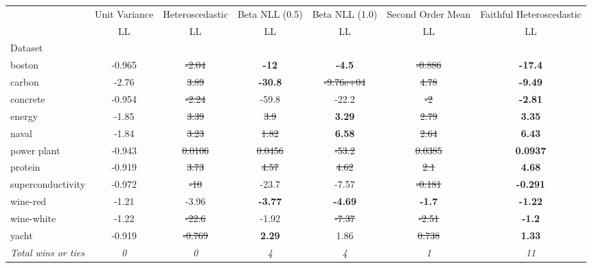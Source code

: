 \begin{tabular}{l|c|c|c|c|c|c}
\toprule
{} & {Unit Variance} & {Heteroscedastic} & {Beta NLL (0.5)} & {Beta NLL (1.0)} & {Second Order Mean} & {Faithful Heteroscedastic} \\
{} & {LL} & {LL} & {LL} & {LL} & {LL} & {LL} \\
{Dataset} & {} & {} & {} & {} & {} & {} \\
\midrule
boston & -0.965 & \sout{-2.04} & \textbf{-12} & \textbf{-4.5} & \sout{-0.886} & \textbf{-17.4} \\
carbon & -2.76 & \sout{3.89} & \textbf{-30.8} & \sout{-9.76e+04} & \sout{4.78} & \textbf{-9.49} \\
concrete & -0.954 & \sout{-2.24} & -59.8 & -22.2 & \sout{-2} & \textbf{-2.81} \\
energy & -1.85 & \sout{3.39} & \sout{3.9} & \textbf{3.29} & \sout{2.79} & \textbf{3.35} \\
naval & -1.84 & \sout{3.23} & \sout{1.82} & \textbf{6.58} & \sout{2.64} & \textbf{6.43} \\
power plant & -0.943 & \sout{0.0106} & \sout{0.0456} & \sout{-53.2} & \sout{0.0385} & \textbf{0.0937} \\
protein & -0.919 & \sout{3.73} & \sout{4.57} & \sout{4.62} & \sout{2.1} & \textbf{4.68} \\
superconductivity & -0.972 & \sout{-10} & -23.7 & -7.57 & \sout{-0.181} & \textbf{-0.291} \\
wine-red & -1.21 & -3.96 & \textbf{-3.77} & \textbf{-4.69} & \textbf{-1.7} & \textbf{-1.22} \\
wine-white & -1.22 & \sout{-22.6} & -1.92 & \sout{-7.37} & \sout{-2.51} & \textbf{-1.2} \\
yacht & -0.919 & \sout{-0.769} & \textbf{2.29} & 1.86 & \sout{0.738} & \textbf{1.33} \\
\textit{{Total wins or ties}} & \textit{0} & \textit{0} & \textit{4} & \textit{4} & \textit{1} & \textit{11} \\
\bottomrule
\end{tabular}
